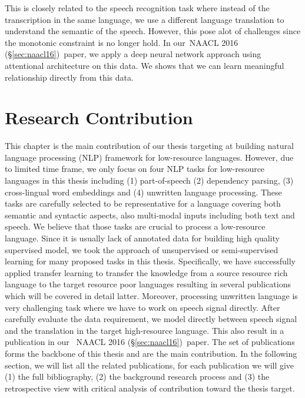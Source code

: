 \documentclass[12pt,twoside,final,hidelinks]{ltthesis}
\theoremstyle{definition}
\newcommand\naaclvi{NAACL 2016 (\S\ref{sec:naacl16})}
\begin{document}
This is closely related to the speech recognition task where instead of the transcription in the same language, we use a different language translation to understand the semantic of the speech. However, this pose alot of challenges since the monotonic constraint is no longer hold. In our~\naaclvi\ paper, we apply a deep neural network approach using attentional architecture on this data. We shows that we can learn meaningful relationship directly from this data.   


\chapter{Research Contribution}
\label{chap:research_summary}
This chapter is the main contribution of our thesis targeting at building natural language processing (NLP) framework for low-resource languages. 
However, due to limited time frame, we only focus on four NLP tasks 
for low-resource languages in this thesis including (1) part-of-speech  (2) dependency parsing, (3) cross-lingual word embeddings and (4) unwritten 
language processing. These tasks are carefully selected to be representative for a language covering both semantic and syntactic aspects, also 
multi-modal inputs including both text and speech. We believe that those tasks are crucial to process a low-resource language.  
Since it is usually lack of annotated data for building high quality supervised model, we took the approach of 
unsupervised or semi-supervised learning for many proposed tasks in this thesis. Specifically, we have successfully applied transfer learning 
to transfer the knowledge from a source resource rich language to the target resource poor languages resulting in several publications which will be 
covered in detail latter. Moreover, processing unwritten language is very challenging task where we have to work on speech signal directly. After
carefully evaluate the data requirement, we model directly between speech signal and the translation in the target high-resource language. This also 
result in a publication in our ~\naaclvi\ paper.
The set of publications forms the backbone of this thesis and are the main contribution. 
In the following section, we will list all the related publications, for each publication we will give (1) the full bibliography, (2) the background research process and (3) the retrospective view with critical analysis of contribution toward the thesis target. 
\end{document}
